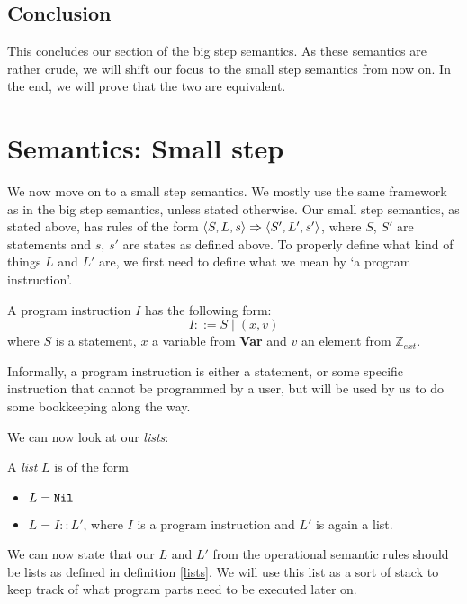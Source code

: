 \subsection{Conclusion}
This concludes our section of the big step semantics. As these semantics are rather crude, we will shift our focus to the small step semantics from now on. In the end, we will prove that the two are equivalent.


\section{Semantics: Small step}
We now move on to a small step semantics. We mostly use the same framework as in the big step semantics, unless stated otherwise. Our small step semantics, as stated above, has rules of the form $\langle S, L, s \rangle \Rightarrow \langle S', L', s' \rangle$, where $S$, $S'$ are statements and $s$, $s'$ are states as defined above. To properly define what kind of things $L$ and $L'$ are, we first need to define what we mean by `a program instruction'. 

\begin{definition}
A program instruction $I$ has the following form:
$$I ::= S \mid (x,v)$$
where $S$ is a statement, $x$ a variable from \textbf{Var} and $v$ an element from $\mathbb{Z}_{ext}$.
\end{definition}

Informally, a program instruction is either a statement, or some specific instruction that cannot be programmed by a user, but will be used by us to do some bookkeeping along the way. 

We can now look at our \emph{lists}:

\begin{definition}
\label{lists}
A \emph{list} $L$ is of the form 
\begin{itemize}[noitemsep]
    \item $L = \texttt{Nil}$
    \item $L = I::L'$, where $I$ is a program instruction and $L'$ is again a list. 
\end{itemize}
\end{definition}

We can now state that our $L$ and $L'$ from the operational semantic rules should be lists as defined in definition \ref{lists}. We will use this list as a sort of stack to keep track of what program parts need to be executed later on. 


